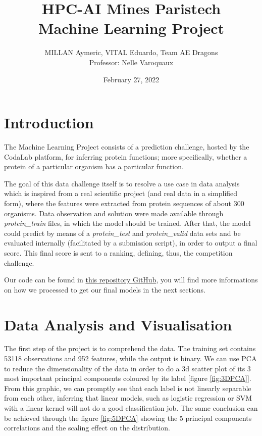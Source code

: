 \documentclass[letterpaper,11pt]{article}
\begin{document}
\title{HPC-AI Mines Paristech \\\textbf{Machine Learning Project}}
\author{MILLAN Aymeric, VITAL Eduardo, Team AE Dragons\\[1cm]{\small Professor: Nelle Varoquaux}}
\date{February 27, 2022}
\maketitle

\section{Introduction}

The Machine Learning Project consists of a prediction challenge, hosted by the
CodaLab platform, for inferring protein functions; more specifically, whether a
protein of a particular organism has a particular function.

The goal of this data challenge itself is to resolve a use case in data analysis
which is inspired from a real scientific project (and real data in a simplified
form), where the features were extracted from protein sequences of about 300
organisms. Data observation and solution were made available through
\textit{protein\_train} files, in which the model should be trained. After that,
the model could predict by means of a \textit{protein\_test} and
\textit{protein\_valid} data sets and be evaluated internally (facilitated by a
submission script), in order to output a final score. This final score is sent
to a ranking, defining, thus, the competition challenge.

Our code can be found in
\href{https://github.com/Aympab/ML-project}{this repository GitHub},
you will find more informations on how we processed to get our final models in
the next sections.

\section{Data Analysis and Visualisation}
The first step of the project is to comprehend the data. The training set
contains 53118 observations and 952 features, while the output is binary. We can
use PCA to reduce the dimensionality of the data in order to do a 3d scatter
plot of its 3 most important principal components coloured by its
label [figure \ref{fig:3DPCA}]. From this graphic, we can promptly see that each
label is not linearly separable from each other, inferring that linear models,
such as logistic regression or SVM with a linear kernel will not do a good
classification job. The same conclusion can be achieved through the figure
\ref{fig:5DPCA} showing the 5 principal components correlations and the scaling
effect on the distribution.
\end{document}
